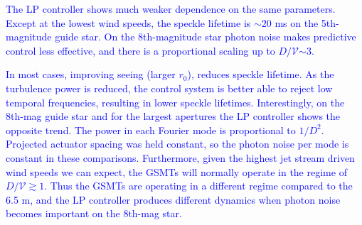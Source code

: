 \documentclass[10pt,preprint]{aastex631}
\newcommand{\jrmadd}[1]{\textcolor{blue}{#1}}
\begin{document}
\jrmadd{The LP controller shows much weaker dependence on the same parameters.  Except at the lowest wind speeds, the speckle lifetime is $\sim$$20$ ms on the 5th-magnitude guide star.  On the 8th-magnitude star photon noise makes predictive control less effective, and there is a proportional scaling up to $D/\mathcal{V}$$\sim$$3$.}

\jrmadd{In most cases, improving seeing (larger $r_0$), reduces speckle lifetime.  As the turbulence power is reduced, the control system is better able to reject low temporal frequencies, resulting in lower speckle lifetimes.  Interestingly, on the 8th-mag guide star and for the largest apertures the LP controller shows the opposite trend.  The power in each Fourier mode is proportional to $1/D^2$.  Projected actuator spacing was held constant, so the photon noise per mode is constant in these comparisons.  Furthermore, given the highest jet stream driven wind speeds we can expect, the GSMTs will normally operate in the regime of $D/\mathcal{V} \gtrsim 1$.  Thus the GSMTs are operating in a different regime compared to the 6.5 m, and the LP controller produces different dynamics  when photon noise becomes important on the 8th-mag star.}



\end{document}
